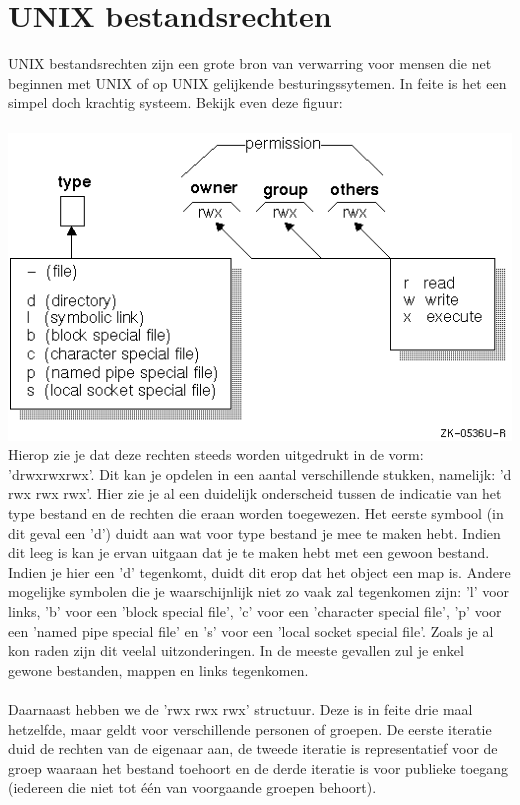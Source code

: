 \chapter{UNIX bestandsrechten}
UNIX bestandsrechten zijn een grote bron van verwarring voor mensen die net beginnen met UNIX of op UNIX gelijkende besturingssytemen. In feite is het een simpel doch krachtig systeem. Bekijk even deze figuur:\\\\
\includegraphics[scale=0.7]{src/unix_file_permissions.png}
%
Hierop zie je dat deze rechten steeds worden uitgedrukt in de vorm: 'drwxrwxrwx'. Dit kan je opdelen in een aantal verschillende stukken, namelijk: 'd rwx rwx rwx'. Hier zie je al een duidelijk onderscheid tussen de indicatie van het type bestand en de rechten die eraan worden toegewezen. Het eerste symbool (in dit geval een 'd') duidt aan wat voor type bestand je mee te maken hebt. Indien dit leeg is kan je ervan uitgaan dat je te maken hebt met een gewoon bestand. Indien je hier een 'd' tegenkomt, duidt dit erop dat het object een map is. Andere mogelijke symbolen die je waarschijnlijk niet zo vaak zal tegenkomen zijn: 'l' voor links, 'b' voor een 'block special file', 'c' voor een 'character special file', 'p' voor een 'named pipe special file' en 's' voor een 'local socket special file'. Zoals je al kon raden zijn dit veelal uitzonderingen. In de meeste gevallen zul je enkel gewone bestanden, mappen en links tegenkomen.\\\\
%
Daarnaast hebben we de 'rwx rwx rwx' structuur. Deze is in feite drie maal hetzelfde, maar geldt voor verschillende personen of groepen. De eerste iteratie duid de rechten van de eigenaar aan, de tweede iteratie is representatief voor de groep waaraan het bestand toehoort en de derde iteratie is voor publieke toegang (iedereen die niet tot \'e\'en van voorgaande groepen behoort).\\\\

